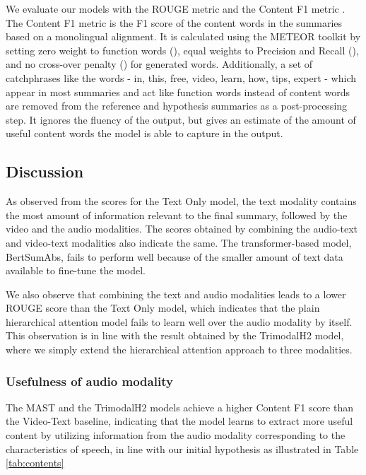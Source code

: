 \documentclass[11pt,a4paper]{article}
\begin{document}
We evaluate our models with the ROUGE metric \cite{lin2004rouge} and the Content F1 metric \cite{palaskar2019multimodal}. The Content F1 metric is the F1 score of the content words in the summaries based on a monolingual alignment. It is calculated using the METEOR toolkit \cite{denkowski2011meteor} by setting zero weight to function words (), equal weights to Precision and Recall (), and no cross-over penalty () for generated words. Additionally, a set of catchphrases like the words - in, this, free, video, learn, how, tips, expert - which appear in most summaries and act like function words instead of content words are removed from the reference and hypothesis summaries as a post-processing step. It ignores the fluency of the output, but gives an estimate of the amount of useful content words the model is able to capture in the output.

\subsection{Discussion}
As observed from the scores for the Text Only model, the text modality contains the most amount of information relevant to the final summary, followed by the video and the audio modalities. The scores obtained by combining the audio-text and video-text modalities also indicate the same. The transformer-based model, BertSumAbs, fails to perform well because of the smaller amount of text data available to fine-tune the model.

We also observe that combining the text and audio modalities leads to a lower ROUGE score than the Text Only model, which indicates that the plain hierarchical attention model fails to learn well over the audio modality by itself. This observation is in line with the result obtained by the TrimodalH2 model, where we simply extend the hierarchical attention approach to three modalities.

\subsubsection{Usefulness of audio modality}
 
The MAST and the TrimodalH2 models achieve a higher Content F1 score than the Video-Text baseline, indicating that the model learns to extract more useful content by utilizing information from the audio modality corresponding to the characteristics of speech, in line with our initial hypothesis as illustrated in Table \ref{tab:contents}
\end{document}
